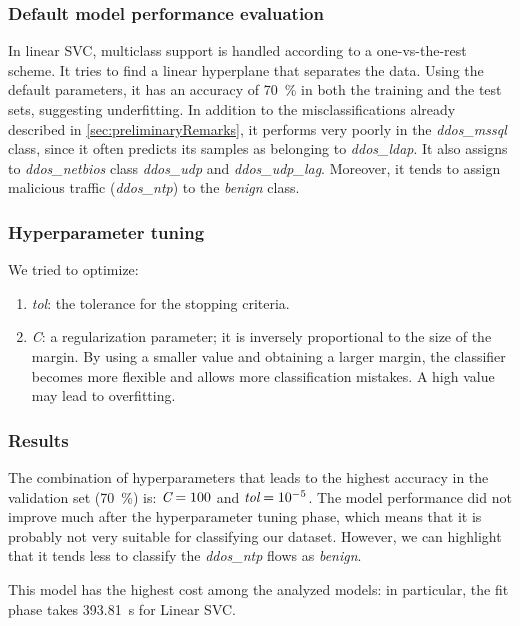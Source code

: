 \documentclass[acmlarge,nonacm]{acmart}
\begin{document}
\subsubsection{Default model performance evaluation} \hspace{0pt}
In linear SVC, multiclass support is handled according to a one-vs-the-rest scheme. It tries to find a linear hyperplane that separates the data. Using the default parameters, it has an accuracy of \SI{70}{\percent} in both the training and the test sets, suggesting underfitting. In addition to the misclassifications already described in \cref{sec:preliminaryRemarks}, it performs very poorly in the \emph{ddos\_mssql} class, since it often predicts its samples as belonging to \emph{ddos\_ldap}. It also assigns to \emph{ddos\_netbios} class \emph{ddos\_udp} and \emph{ddos\_udp\_lag}. Moreover, it tends to assign malicious traffic (\emph{ddos\_ntp}) to the \emph{benign} class.

\subsubsection{Hyperparameter tuning} 
We tried to optimize:
\begin{enumerate}
    \item \emph{tol}: the tolerance for the stopping criteria.
    \item \emph{C}: a regularization parameter; it is inversely proportional to the size of the margin. By using a smaller value and obtaining a larger margin, the classifier becomes more flexible and allows more classification mistakes. A high value may lead to overfitting.
\end{enumerate}

\subsubsection{Results}
The combination of hyperparameters that leads to the highest accuracy in the validation set (\SI{70}{\percent}) is: $\emph{C}=100$ and $\emph{tol}=\num{e-5}$. The model performance did not improve much after the hyperparameter tuning phase, which means that it is probably not very suitable for classifying our dataset. However, we can highlight that it tends less to classify the \emph{ddos\_ntp} flows as \emph{benign}.

This model has the highest cost among the analyzed models: in particular, the fit phase takes \SI{393.81}{\second} for Linear SVC.
\end{document}
